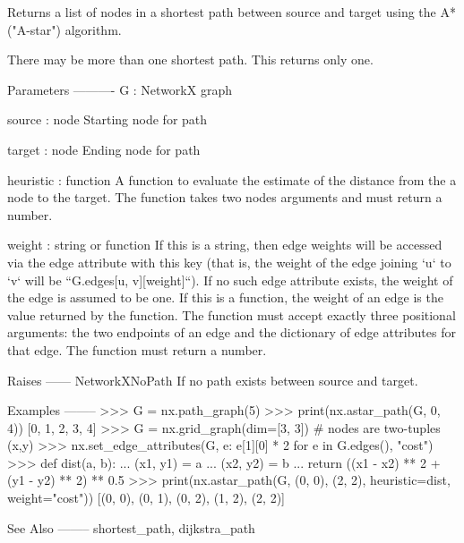 \begin{DoxyVerb}Returns a list of nodes in a shortest path between source and target
using the A* ("A-star") algorithm.

There may be more than one shortest path.  This returns only one.

Parameters
----------
G : NetworkX graph

source : node
   Starting node for path

target : node
   Ending node for path

heuristic : function
   A function to evaluate the estimate of the distance
   from the a node to the target.  The function takes
   two nodes arguments and must return a number.

weight : string or function
   If this is a string, then edge weights will be accessed via the
   edge attribute with this key (that is, the weight of the edge
   joining `u` to `v` will be ``G.edges[u, v][weight]``). If no
   such edge attribute exists, the weight of the edge is assumed to
   be one.
   If this is a function, the weight of an edge is the value
   returned by the function. The function must accept exactly three
   positional arguments: the two endpoints of an edge and the
   dictionary of edge attributes for that edge. The function must
   return a number.

Raises
------
NetworkXNoPath
    If no path exists between source and target.

Examples
--------
>>> G = nx.path_graph(5)
>>> print(nx.astar_path(G, 0, 4))
[0, 1, 2, 3, 4]
>>> G = nx.grid_graph(dim=[3, 3])  # nodes are two-tuples (x,y)
>>> nx.set_edge_attributes(G, {e: e[1][0] * 2 for e in G.edges()}, "cost")
>>> def dist(a, b):
...     (x1, y1) = a
...     (x2, y2) = b
...     return ((x1 - x2) ** 2 + (y1 - y2) ** 2) ** 0.5
>>> print(nx.astar_path(G, (0, 0), (2, 2), heuristic=dist, weight="cost"))
[(0, 0), (0, 1), (0, 2), (1, 2), (2, 2)]


See Also
--------
shortest_path, dijkstra_path\end{DoxyVerb}
 \mbox{\label{namespacenetworkx_1_1algorithms_1_1shortest__paths_1_1astar_ab18470a75227f7b4fe600b156d60ab46}} 
